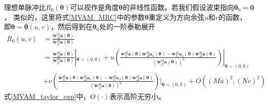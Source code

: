 \documentclass[master]{thesis-uestc}
\begin{document}
理想单脉冲比$R_0(\bm{\theta})$可以视作是角度$\bm{\theta}$的非线性函数。若我们假设波束指向$\bm{\theta}_0=\textbf{0}$，
类似的，这里将式\eqref{MVAM_MRC}中的参数$\bm{\theta}$重定义为方向余弦$u$和$v$的函数，
即$\bm{\theta}=\bm{\theta}(u,v)$，然后得到在$\bm{\theta}_0$处的一阶泰勒展开
\begin{equation}\label{MVAM_taylor_exp}
    \begin{aligned}
        R_0\left(u,v\right) &= \frac{\bm{w}^H_\Delta\bm{a}(\bm{\theta})}{\bm{w}^H_\Sigma\bm{a}(\bm{\theta})} \\
        &= \frac{\bm{w}^H_\Delta\bm{a}(\bm{\theta})}{\bm{w}^H_\Sigma\bm{a}(\bm{\theta})}|_{\bm{\theta}=(0,0)} + 
        u\left(
            \frac
            {
                \bm{w}^H_\Sigma\bm{a}(\bm{\theta})\bm{w}^H_\Delta\bm{a}_u(\bm{\theta}) - 
                \bm{w}^H_\Sigma\bm{a}_u(\bm{\theta})\bm{w}^H_\Delta\bm{a}(\bm{\theta})
            }
            {\left(\bm{w}^H_\Sigma\bm{a}(\bm{\theta})\right)^2}
         \right)|_{\bm{\theta}=(0,0)} \\
        &+
        v\left(
            \frac
            {
                \bm{w}^H_\Sigma\bm{a}(\bm{\theta})\bm{w}^H_\Delta\bm{a}_v(\bm{\theta}) - 
                \bm{w}^H_\Sigma\bm{a}_v(\bm{\theta})\bm{w}^H_\Delta\bm{a}(\bm{\theta})
            }
            {\left(\bm{w}^H_\Sigma\bm{a}(\bm{\theta})\right)^2}
         \right)|_{\bm{\theta}=(0,0)} 
        + O\left((Mu)^2,(Nv)^2\right)
    \end{aligned}
\end{equation}
式\eqref{MVAM_taylor_exp}中，$O(\cdot)$表示高阶无穷小。
\end{document}
